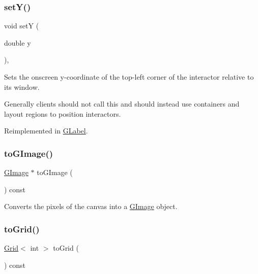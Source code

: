 \mbox{\label{classGInteractor_a7d57e2a5c35d27feb58fd498a3cf82b9}} 
\subsubsection{\texorpdfstring{set\+Y()}{setY()}}
{\footnotesize\ttfamily void setY (\begin{DoxyParamCaption}\item[{double}]{y }\end{DoxyParamCaption})\hspace{0.3cm}{\ttfamily [virtual]}, {\ttfamily [inherited]}}



Sets the onscreen y-\/coordinate of the top-\/left corner of the interactor relative to its window. 

Generally clients should not call this and should instead use containers and layout regions to position interactors. 

Reimplemented in \mbox{\hyperlink{classGLabel_a59633abb35b676c54d88ea6cd384fc55}{G\+Label}}.

\mbox{\label{classGCanvas_aa2b5affed24054a09bddfe568d11200b}} 
\subsubsection{\texorpdfstring{to\+G\+Image()}{toGImage()}}
{\footnotesize\ttfamily \mbox{\hyperlink{classGImage}{G\+Image}} $\ast$ to\+G\+Image (\begin{DoxyParamCaption}{ }\end{DoxyParamCaption}) const\hspace{0.3cm}{\ttfamily [virtual]}}



Converts the pixels of the canvas into a \mbox{\hyperlink{classGImage}{G\+Image}} object. 

\mbox{\label{classGCanvas_a2f9b15856aaf66aa95cfd7405bd972cc}} 
\subsubsection{\texorpdfstring{to\+Grid()}{toGrid()}\hspace{0.1cm}{\footnotesize\ttfamily [1/2]}}
{\footnotesize\ttfamily \mbox{\hyperlink{classGrid}{Grid}}$<$ int $>$ to\+Grid (\begin{DoxyParamCaption}{ }\end{DoxyParamCaption}) const\hspace{0.3cm}{\ttfamily [virtual]}}



